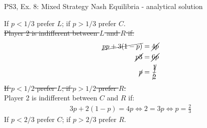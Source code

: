 \begin{frame}{PS3, Ex. 8: Mixed Strategy Nash Equilibria - analytical solution}
\begin{multicols}{2}
    If $p<1/3$ prefer $L$; if $p>1/3$ prefer $C$.\\\medskip
    \sout{Player 2 is indifferent between $L$ and $R$ if:}
    \begin{align*}
      \cancel{pp+3(1-p)}&= \cancel{4p } \\
      \cancel{p3}       &= \cancel{6p } \\
      \cancel{p}        &= \cancel{\frac{1}{2} }
    \end{align*}
    \sout{If $p<1/2$ prefer $L$; if $p>1/2$ prefer $R$.}\\\medskip
    Player 2 is indifferent between $C$ and $R$ if:
    \begin{align*}
      3p+2(1-p) = 4p \Leftrightarrow 2 = 3p \Leftrightarrow p = \frac{2}{3}
    \end{align*}
    If $p<2/3$ prefer $C$; if $p>2/3$ prefer $R$.\\\medskip
  \vfill\null
  \end{multicols}
\end{frame}
